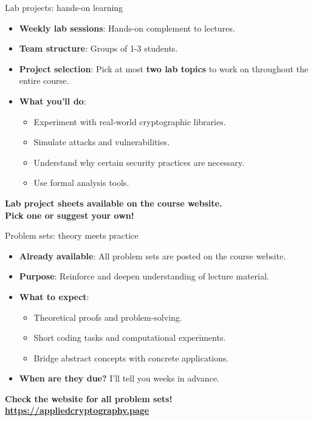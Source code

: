 \documentclass[aspectratio=169, lualatex, handout]{beamer}
\begin{document}
\begin{frame}{Lab projects: hands-on learning}
	\begin{itemize}[<+->]
		\item \textbf{Weekly lab sessions}: Hands-on complement to lectures.
		\item \textbf{Team structure}: Groups of 1-3 students.
		\item \textbf{Project selection}: Pick at most \textbf{two lab topics} to work on throughout the entire course.
		\item \textbf{What you'll do}:
		      \begin{itemize}
			      \item Experiment with real-world cryptographic libraries.
			      \item Simulate attacks and vulnerabilities.
			      \item Understand why certain security practices are necessary.
			      \item Use formal analysis tools.
		      \end{itemize}
	\end{itemize}
	\vspace{0.1cm}
	\begin{center}
		\Large\textcolor{cipherprimary}{\textbf{Lab project sheets available on the course website. \\ Pick one or suggest your own!}}
	\end{center}
\end{frame}

\begin{frame}{Problem sets: theory meets practice}
	\begin{itemize}[<+->]
		\item \textbf{Already available}: All problem sets are posted on the course website.
		\item \textbf{Purpose}: Reinforce and deepen understanding of lecture material.
		\item \textbf{What to expect}:
		      \begin{itemize}
			      \item Theoretical proofs and problem-solving.
			      \item Short coding tasks and computational experiments.
			      \item Bridge abstract concepts with concrete applications.
		      \end{itemize}
		\item \textbf{When are they due?} I'll tell you weeks in advance.
	\end{itemize}
	\vspace{0.5cm}
	\begin{center}
		\Large\textcolor{cipherprimary}{\textbf{Check the website for all problem sets! \\ \url{https://appliedcryptography.page}}}
	\end{center}
\end{frame}
\end{document}

